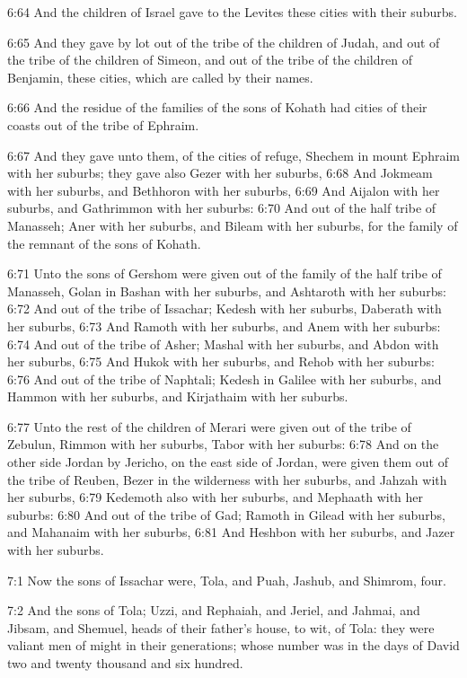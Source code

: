 6:64 And the children of Israel gave to the Levites these cities with their suburbs.

6:65 And they gave by lot out of the tribe of the children of Judah, and out of the tribe of the children of Simeon, and out of the tribe of the children of Benjamin, these cities, which are called by their names.

6:66 And the residue of the families of the sons of Kohath had cities of their coasts out of the tribe of Ephraim.

6:67 And they gave unto them, of the cities of refuge, Shechem in mount Ephraim with her suburbs; they gave also Gezer with her suburbs, 6:68 And Jokmeam with her suburbs, and Bethhoron with her suburbs, 6:69 And Aijalon with her suburbs, and Gathrimmon with her suburbs: 6:70 And out of the half tribe of Manasseh; Aner with her suburbs, and Bileam with her suburbs, for the family of the remnant of the sons of Kohath.

6:71 Unto the sons of Gershom were given out of the family of the half tribe of Manasseh, Golan in Bashan with her suburbs, and Ashtaroth with her suburbs: 6:72 And out of the tribe of Issachar; Kedesh with her suburbs, Daberath with her suburbs, 6:73 And Ramoth with her suburbs, and Anem with her suburbs: 6:74 And out of the tribe of Asher; Mashal with her suburbs, and Abdon with her suburbs, 6:75 And Hukok with her suburbs, and Rehob with her suburbs: 6:76 And out of the tribe of Naphtali; Kedesh in Galilee with her suburbs, and Hammon with her suburbs, and Kirjathaim with her suburbs.

6:77 Unto the rest of the children of Merari were given out of the tribe of Zebulun, Rimmon with her suburbs, Tabor with her suburbs: 6:78 And on the other side Jordan by Jericho, on the east side of Jordan, were given them out of the tribe of Reuben, Bezer in the wilderness with her suburbs, and Jahzah with her suburbs, 6:79 Kedemoth also with her suburbs, and Mephaath with her suburbs: 6:80 And out of the tribe of Gad; Ramoth in Gilead with her suburbs, and Mahanaim with her suburbs, 6:81 And Heshbon with her suburbs, and Jazer with her suburbs.

7:1 Now the sons of Issachar were, Tola, and Puah, Jashub, and Shimrom, four.

7:2 And the sons of Tola; Uzzi, and Rephaiah, and Jeriel, and Jahmai, and Jibsam, and Shemuel, heads of their father's house, to wit, of Tola: they were valiant men of might in their generations; whose number was in the days of David two and twenty thousand and six hundred.


